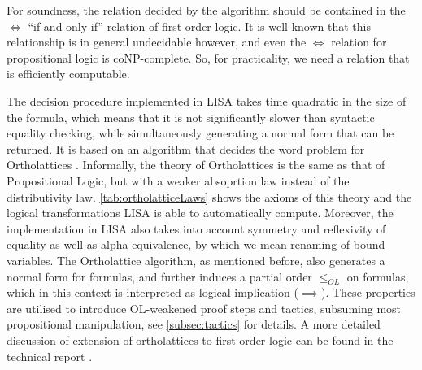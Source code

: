 For soundness, the relation decided by the algorithm should be contained in the $\Longleftrightarrow$ ``if and only if'' relation of first order logic. It is well known that this relationship is in general undecidable however, and even the $\Longleftrightarrow$ relation for propositional logic is coNP-complete. So, for practicality, we need a relation that is efficiently computable.

The decision procedure implemented in LISA takes time quadratic in the size of the formula, which means that it is not significantly slower than syntactic equality checking, while simultaneously generating a normal form that can be returned.
It is based on an algorithm that decides the word problem for Ortholattices \cite{Guilloud:297701}.
Informally, the theory of Ortholattices is the same as that of Propositional Logic, but with a weaker absoprtion law instead of the distributivity law. \autoref{tab:ortholatticeLaws} shows the axioms of this theory and the logical transformations LISA is able to automatically compute.
Moreover, the implementation in LISA also takes into account symmetry and reflexivity of equality as well as alpha-equivalence, by which we mean renaming of bound variables.
The Ortholattice algorithm, as mentioned before, also generates a normal form for formulas, and further induces a partial order $\leq_{OL}$ on formulas, which in this context is interpreted as logical implication ($\implies$). These properties are utilised to introduce OL-weakened proof steps and tactics, subsuming most propositional manipulation, see \autoref{subsec:tactics} for details.
%
A more detailed discussion of extension of ortholattices to first-order logic can be found in the technical report \cite{Guilloud:300562}.

